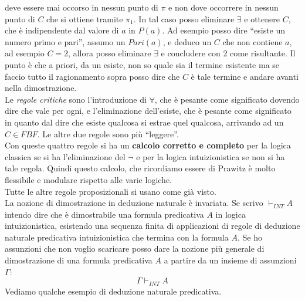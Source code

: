 \documentclass[a4paper,12pt, oneside]{book}
\begin{document}
deve essere mai occorso in nessun punto di $\pi$ e non dove occorrere in nessun
punto di $C$ che si ottiene tramite $\pi_1$. In tal caso posso eliminare
$\exists$ e ottenere $C$, che è indipendente dal valore di $a$ in $P(a)$. Ad
esempio posso dire ``esiste un numero primo e pari'', assumo un $Pari(a)$, e
deduco un $C$ che non contiene $a$, ad esempio $C=2$, allora posso eliminare
$\exists$ e concludere con 2 come risultante. Il punto è che a priori, da un
esiste, non so quale sia il termine esistente ma se faccio tutto il ragionamento
sopra posso dire che $C$ è tale termine e andare avanti nella dimostrazione.\\
Le \textit{regole critiche} sono l'introduzione di $\forall$, che è pesante come
significato dovendo dire che vale per ogni, e l'eliminazione dell'esiste, che è
pesante come significato in quanto dal dire che esiste qualcosa si estrae quel
qualcosa, arrivando ad un $C\in FBF$. Le altre due regole sono più
``leggere''.\\
Con queste quattro regole si ha un \textbf{calcolo corretto e completo} per la
logica classica se si ha l'eliminazione del $\neg$ e per la logica
intuizionistica se non si ha tale regola. Quindi questo calcolo, che ricordiamo
essere di Prawitz è molto flessibile e modulare rispetto alle varie logiche.\\
Tutte le altre regole proposizionali si usano come già visto.\\
La nozione di dimostrazione in deduzione naturale è invariata. Se scrivo
$\vdash_{INT}A$ intendo dire che è dimostrabile una formula predicativa $A$ in
logica intuizionistica, esistendo una sequenza finita di applicazioni di regole
di deduzione naturale predicativa intuizionistica che termina con la formula
$A$. Se ho assunzioni che non voglio scaricare posso dare la nozione più
generale di dimostrazione di una formula predicativa $A$ a partire da un insieme
di assunzioni $\Gamma$:
\[\Gamma\vdash_{INT} A\]
Vediamo qualche esempio di deduzione naturale predicativa.
\end{document}
